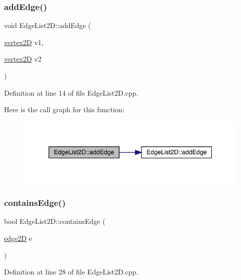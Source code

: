 \subsubsection{\texorpdfstring{add\+Edge()}{addEdge()}\hspace{0.1cm}{\footnotesize\ttfamily [2/2]}}
{\footnotesize\ttfamily void Edge\+List2\+D\+::add\+Edge (\begin{DoxyParamCaption}\item[{\mbox{\hyperlink{structvertex2_d}{vertex2D}}}]{v1,  }\item[{\mbox{\hyperlink{structvertex2_d}{vertex2D}}}]{v2 }\end{DoxyParamCaption})}



Definition at line 14 of file Edge\+List2\+D.\+cpp.

Here is the call graph for this function\+:
\nopagebreak
\begin{figure}[H]
\begin{center}
\leavevmode
\includegraphics[width=343pt]{class_edge_list2_d_ad0085ac0f30c9135a8193bfef627e57f_cgraph}
\end{center}
\end{figure}
\mbox{\label{class_edge_list2_d_a9d5ecf2dd50e5f75e189b9588ae784cc}} 
\subsubsection{\texorpdfstring{contains\+Edge()}{containsEdge()}}
{\footnotesize\ttfamily bool Edge\+List2\+D\+::contains\+Edge (\begin{DoxyParamCaption}\item[{\mbox{\hyperlink{structedge2_d}{edge2D}}}]{e }\end{DoxyParamCaption})}



Definition at line 28 of file Edge\+List2\+D.\+cpp.

